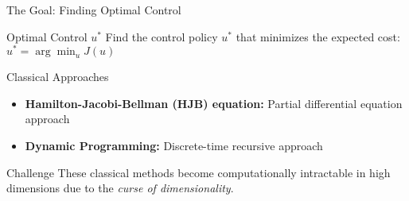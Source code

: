 \documentclass[aspectratio=169,xcolor=dvipsnames]{beamer}
\begin{document}
\begin{frame}{The Goal: Finding Optimal Control}
    \begin{block}{Optimal Control $u^*$}
        Find the control policy $u^*$ that minimizes the expected cost: $u^* = \arg\min_u J(u)$
    \end{block}
    
    \vspace{0.3cm}
    
    \begin{block}{Classical Approaches}
        \begin{itemize}
            \item \textbf{Hamilton-Jacobi-Bellman (HJB) equation:} Partial differential equation approach
            \item \textbf{Dynamic Programming:} Discrete-time recursive approach
        \end{itemize}
    \end{block}
    
    \vspace{0.3cm}
    
    \begin{alertblock}{Challenge}
        These classical methods become computationally intractable in high dimensions due to the \textit{curse of dimensionality}.
    \end{alertblock}
\end{frame}



\end{document}
